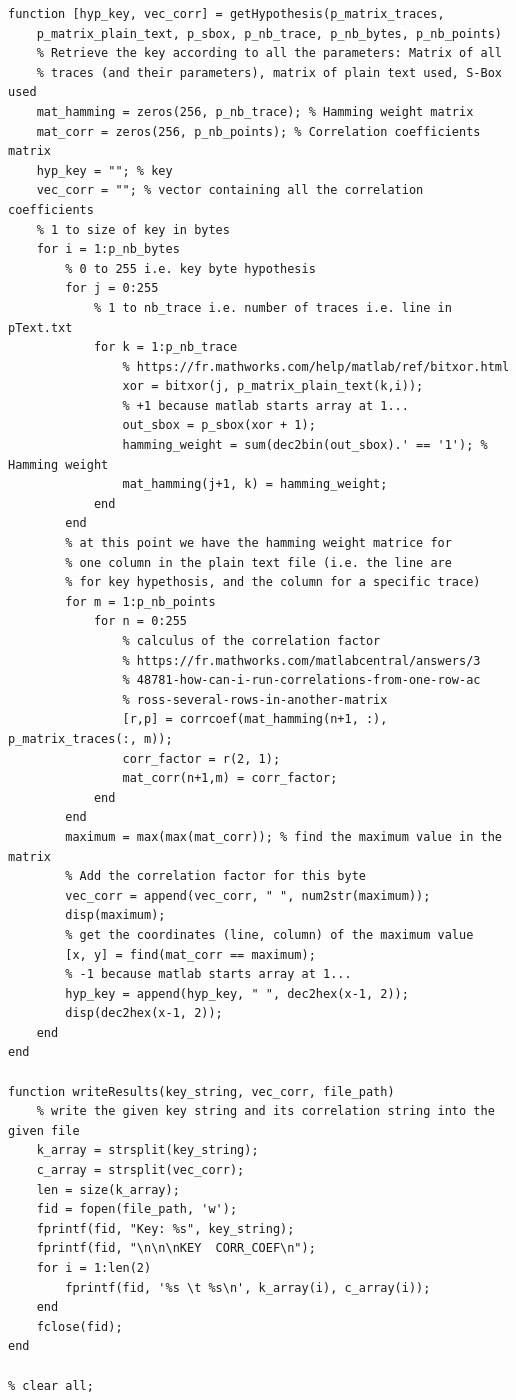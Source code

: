 \documentclass[a4paper, 12pt]{article}
\begin{document}
\begin{lstlisting}
function [hyp_key, vec_corr] = getHypothesis(p_matrix_traces, 
	p_matrix_plain_text, p_sbox, p_nb_trace, p_nb_bytes, p_nb_points)
    % Retrieve the key according to all the parameters: Matrix of all
    % traces (and their parameters), matrix of plain text used, S-Box used
    mat_hamming = zeros(256, p_nb_trace); % Hamming weight matrix
    mat_corr = zeros(256, p_nb_points); % Correlation coefficients matrix
    hyp_key = ""; % key
    vec_corr = ""; % vector containing all the correlation coefficients
    % 1 to size of key in bytes
    for i = 1:p_nb_bytes 
    	% 0 to 255 i.e. key byte hypothesis
        for j = 0:255 
       		% 1 to nb_trace i.e. number of traces i.e. line in pText.txt
            for k = 1:p_nb_trace 
                % https://fr.mathworks.com/help/matlab/ref/bitxor.html
                xor = bitxor(j, p_matrix_plain_text(k,i));
                % +1 because matlab starts array at 1...
                out_sbox = p_sbox(xor + 1); 
                hamming_weight = sum(dec2bin(out_sbox).' == '1'); % Hamming weight
                mat_hamming(j+1, k) = hamming_weight;
            end
        end 
        % at this point we have the hamming weight matrice for 
        % one column in the plain text file (i.e. the line are 
        % for key hypethosis, and the column for a specific trace)
        for m = 1:p_nb_points
            for n = 0:255
                % calculus of the correlation factor
                % https://fr.mathworks.com/matlabcentral/answers/3
                % 48781-how-can-i-run-correlations-from-one-row-ac
                % ross-several-rows-in-another-matrix
                [r,p] = corrcoef(mat_hamming(n+1, :), p_matrix_traces(:, m));
                corr_factor = r(2, 1);
                mat_corr(n+1,m) = corr_factor;
            end
        end
        maximum = max(max(mat_corr)); % find the maximum value in the matrix
        % Add the correlation factor for this byte
        vec_corr = append(vec_corr, " ", num2str(maximum)); 
        disp(maximum);
        % get the coordinates (line, column) of the maximum value
        [x, y] = find(mat_corr == maximum); 
        % -1 because matlab starts array at 1...
        hyp_key = append(hyp_key, " ", dec2hex(x-1, 2)); 
        disp(dec2hex(x-1, 2));
    end
end

function writeResults(key_string, vec_corr, file_path)
    % write the given key string and its correlation string into the given file
    k_array = strsplit(key_string);
    c_array = strsplit(vec_corr);
    len = size(k_array);
    fid = fopen(file_path, 'w');
    fprintf(fid, "Key: %s", key_string);
    fprintf(fid, "\n\n\nKEY  CORR_COEF\n");
    for i = 1:len(2)
        fprintf(fid, '%s \t %s\n', k_array(i), c_array(i));
    end
    fclose(fid);
end

% clear all;
\end{lstlisting}
\end{document}
